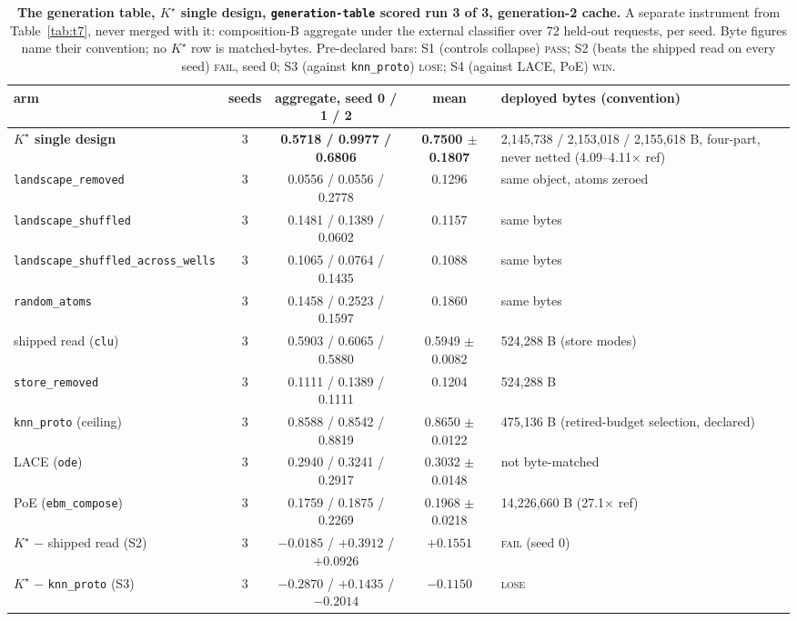 \documentclass{article} %
\newcommand{\Kstar}{\ensuremath{K^{\star}}}
\begin{document}
\begin{table}[h]
\centering\scriptsize
\caption{\textbf{The generation table, $\Kstar$ single design, \texttt{generation-table} scored run 3 of 3, %
generation-2 cache.} A separate instrument from Table~\ref{tab:t7}, never merged with it:
composition-B aggregate under the external classifier over 72 held-out requests, per seed. %
Byte figures name their convention; no $\Kstar$ row is matched-bytes. Pre-declared bars: S1
(controls collapse) \textsc{pass}; S2 (beats the shipped read on every seed) \textsc{fail}, seed 0;
S3 (against \texttt{knn\_proto}) \textsc{lose}; S4 (against LACE, PoE) \textsc{win}.}
\label{tab:gentable-kstar}
\setlength{\tabcolsep}{2.4pt}
\begin{adjustbox}{max width=\linewidth}\begin{tabular}{lcccl}
\toprule
arm & seeds & aggregate, seed 0 / 1 / 2 & mean & deployed bytes (convention) \\
\midrule
\textbf{$\Kstar$ single design} & 3 & \textbf{0.5718 / 0.9977 / 0.6806} & \textbf{0.7500 $\pm$ 0.1807} & 2,145,738 / 2,153,018 / 2,155,618 B, four-part, never netted (4.09--4.11$\times$ ref) \\
\quad \texttt{landscape\_removed} & 3 & 0.0556 / 0.0556 / 0.2778 & 0.1296 & same object, atoms zeroed \\
\quad \texttt{landscape\_shuffled} & 3 & 0.1481 / 0.1389 / 0.0602 & 0.1157 & same bytes \\
\quad \texttt{landscape\_shuffled\_across\_wells} & 3 & 0.1065 / 0.0764 / 0.1435 & 0.1088 & same bytes \\
\quad \texttt{random\_atoms} & 3 & 0.1458 / 0.2523 / 0.1597 & 0.1860 & same bytes \\
shipped read (\texttt{clu}) & 3 & 0.5903 / 0.6065 / 0.5880 & 0.5949 $\pm$ 0.0082 & 524,288 B (store modes) \\
\texttt{store\_removed} & 3 & 0.1111 / 0.1389 / 0.1111 & 0.1204 & 524,288 B \\
\texttt{knn\_proto} (ceiling) & 3 & 0.8588 / 0.8542 / 0.8819 & 0.8650 $\pm$ 0.0122 & 475,136 B (retired-budget selection, declared) \\
LACE (\texttt{ode}) & 3 & 0.2940 / 0.3241 / 0.2917 & 0.3032 $\pm$ 0.0148 & not byte-matched \\
PoE (\texttt{ebm\_compose}) & 3 & 0.1759 / 0.1875 / 0.2269 & 0.1968 $\pm$ 0.0218 & 14,226,660 B (27.1$\times$ ref) \\
\midrule
$\Kstar$ $-$ shipped read (S2) & 3 & $-0.0185$ / $+0.3912$ / $+0.0926$ & $+0.1551$ & \textsc{fail} (seed 0) \\
$\Kstar$ $-$ \texttt{knn\_proto} (S3) & 3 & $-0.2870$ / $+0.1435$ / $-0.2014$ & $-0.1150$ & \textsc{lose} \\
\bottomrule
\end{tabular}\end{adjustbox}
\end{table}
\end{document}
